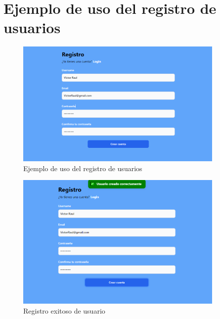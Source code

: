 \documentclass[12pt]{article}
\begin{document}

\section{Ejemplo de uso del registro de usuarios}
\begin{figure}[H]
    \centering
    \includegraphics[width=0.9\textwidth]{./img/Register-example.png}
    \caption{Ejemplo de uso del registro de usuarios}
    \label{fig:my_label}
\end{figure}

\begin{figure}[H]
    \centering
    \includegraphics[width=0.9\textwidth]{./img/Register-successfully.png}
    \caption{Registro exitoso de usuario}
    \label{fig:my_label}
\end{figure}



\end{document}
